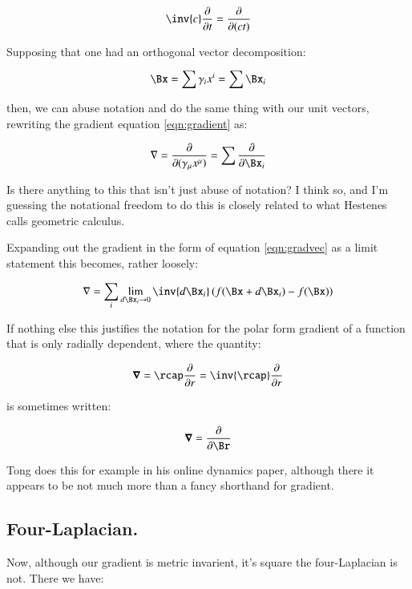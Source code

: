\documentclass{article}
\newcommand{\grad}[0]{\nabla}
\newcommand{\spacegrad}[0]{\boldsymbol{\nabla}}
\newcommand{\PD}[2]{\frac{\partial {#2}}{\partial {#1}}}
\begin{document}
\begin{equation*}
\inv{c} \PD{t}{} = \PD{(ct)}{}
\end{equation*}

Supposing that one had an orthogonal vector decomposition:

\begin{equation*}
\Bx = \sum \gamma_i x^i = \sum \Bx_i
\end{equation*}

then, we can abuse notation and do the same thing with our unit vectors, rewriting the gradient equation \ref{eqn:gradient} as:

\begin{equation}\label{eqn:gradvec}
\grad = \PD{(\gamma_{\mu} x^{\mu})}{} = \sum \PD{\Bx_i}{}
\end{equation}

Is there anything to this that isn't just abuse of notation?  I think so, and I'm guessing the notational freedom to do this is closely related to
what Hestenes calls geometric calculus.

Expanding out the gradient in the form of equation \ref{eqn:gradvec} as a limit statement this becomes, rather loosely:

\begin{equation*}
\grad = \sum_i \lim_{d\Bx_i \to 0} \inv{ d \Bx_i } \left(f( \Bx + d\Bx_i ) - f( \Bx )\right)
\end{equation*}

If nothing else this justifies the notation for the polar form gradient of a function that is only radially dependent, where the quantity:

\begin{equation*}
\spacegrad = \rcap\PD{r}{} = \inv{\rcap}\PD{r}{}
\end{equation*}

is sometimes written:

\begin{equation*}
\spacegrad = \PD{\Br}{}
\end{equation*}

Tong does this for example in his online dynamics paper, although there it appears to be not much more than a fancy shorthand for gradient.

\subsection{ Four-Laplacian. }

Now, although our gradient is metric invarient, it's square the four-Laplacian is not.  There we have:
\end{document}
